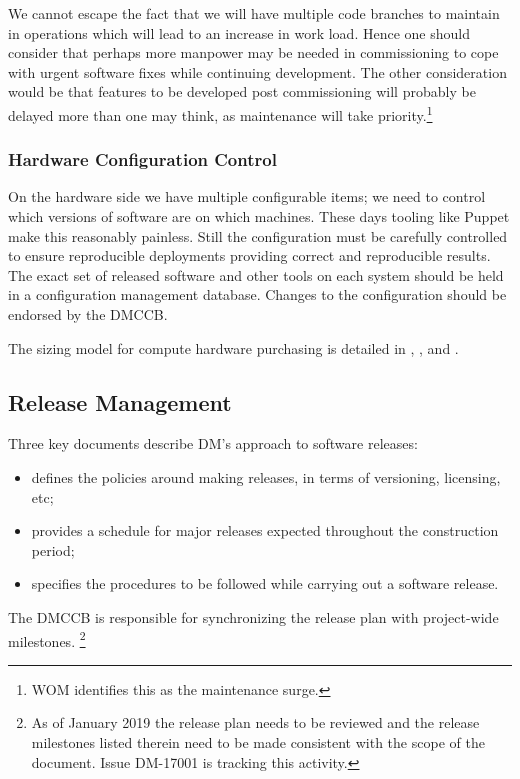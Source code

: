 We cannot escape the fact that we  will have multiple code branches to maintain in operations which will lead to an increase in work load.
Hence one should consider that perhaps more manpower may be needed in commissioning to cope with urgent software fixes while continuing development.
The other consideration would be that features to be developed post commissioning will probably be delayed more than one may think, as maintenance will take priority.\footnote{WOM identifies this as the maintenance surge.}

\subsubsection{Hardware Configuration Control}

On the hardware side we have multiple configurable items; we need to control which versions of software are on which machines. These days tooling like Puppet make this reasonably painless. Still the \gls{configuration}  must be carefully controlled to ensure reproducible deployments providing correct and reproducible results. The exact set of released software and other tools on each system should be held in a \gls{configuration} management database.
Changes to the \gls{configuration} should be endorsed by the \gls{DMCCB}.

The sizing model for compute hardware purchasing is detailed in , , and .

\subsection {Release Management} \label{sect:release}

Three key documents describe DM's approach to software releases:

\begin{itemize}
\item{ defines the policies around making releases, in terms of versioning, licensing, etc;}
\item{ provides a schedule for major releases expected throughout the construction period;}
\item{ specifies the procedures to be followed while carrying out a software release.}
\end{itemize}

The \gls{DMCCB} is responsible for synchronizing the release plan with project-wide milestones.
\footnote{As of January 2019 the release plan needs to be reviewed and the release milestones listed therein need to be made consistent with the scope of the document.
Issue \gls{DM}-17001 is tracking this activity.}

